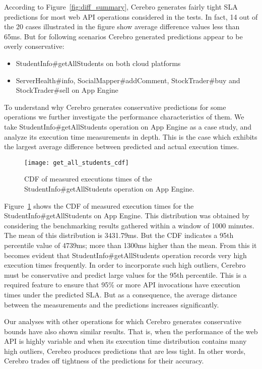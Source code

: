 According to Figure~\ref{fig:diff_summary}, Cerebro generates fairly tight SLA predictions for most web API operations considered in the tests. In fact,
14 out of the 20 cases illustrated in the figure show average difference values less than 65ms. But for following scenarios Cerebro generated
predictions appear to be overly conservative:

\begin{itemize}
\item StudentInfo\#getAllStudents on both cloud platforms
\item ServerHealth\#info, SocialMapper\#addComment, StockTrader\#buy and StockTrader\#sell on App Engine
\end{itemize}

To understand why Cerebro generates conservative predictions for some operations we further 
investigate the performance characteristics of them. We take StudentInfo\#getAllStudents
operation on App Engine as a case study, and analyze its execution time measurements in depth. 
This is the case which exhibits the largest average difference between predicted and actual execution times.

\begin{figure}
\centering
\texttt{[image: get\_all\_students\_cdf]}
\caption{CDF of measured executions times of the StudentInfo\#getAllStudents operation on App Engine.}
\label{fig:get_all_students_cdf}
\end{figure}

Figure~\ref{fig:get_all_students_cdf} shows the CDF of measured execution times for the StudentInfo\#getAllStudents on
App Engine. This distribution was obtained by considering the benchmarking results gathered within a window of 1000 minutes. 
The mean of this distribution is 3431.79ms. But the CDF indicates a 95th percentile value of 4739ms; more
than 1300ms higher than the mean.
From this it becomes evident that StudentInfo\#getAllStudents operation records very high execution times frequently. 
In order to incorporate such high outliers, Cerebro must be conservative and predict large values for
the 95th percentile. This is a required feature to ensure that 95\% or more API invocations have
execution times under the predicted SLA. But as a consequence, the average distance between the 
measurements and the predictions increases significantly.

Our analyses with other operations for which
Cerebro generates conservative bounds have also shown similar results. That is, when the performance of the web API is highly variable and
when its execution time distribution contains
many high outliers, Cerebro produces predictions that are less tight. In other words, 
Cerebro trades off tightness of the predictions for their accuracy.

